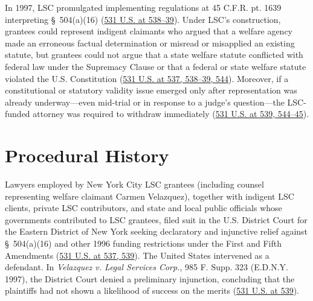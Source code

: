 \documentclass[12pt]{article}
\begin{document}
In 1997, LSC promulgated implementing regulations at 45 C.F.R. pt. 1639 interpreting \S~504(a)(16) (\href{https://supreme.justia.com/cases/federal/us/531/533/}{531 U.S. at 538--39}). Under LSC's construction, grantees could represent indigent claimants who argued that a welfare agency made an erroneous factual determination or misread or misapplied an existing statute, but grantees could not argue that a state welfare statute conflicted with federal law under the Supremacy Clause or that a federal or state welfare statute violated the U.S. Constitution (\href{https://supreme.justia.com/cases/federal/us/531/533/}{531 U.S. at 537, 538--39, 544}). Moreover, if a constitutional or statutory validity issue emerged only after representation was already underway---even mid-trial or in response to a judge's question---the LSC-funded attorney was required to withdraw immediately (\href{https://supreme.justia.com/cases/federal/us/531/533/}{531 U.S. at 539, 544--45}).

\section{Procedural History}
Lawyers employed by New York City LSC grantees (including counsel representing welfare claimant Carmen Velazquez), together with indigent LSC clients, private LSC contributors, and state and local public officials whose governments contributed to LSC grantees, filed suit in the U.S. District Court for the Eastern District of New York seeking declaratory and injunctive relief against \S~504(a)(16) and other 1996 funding restrictions under the First and Fifth Amendments (\href{https://supreme.justia.com/cases/federal/us/531/533/}{531 U.S. at 537, 539}). The United States intervened as a defendant. In \textit{Velazquez v. Legal Services Corp.}, 985 F. Supp. 323 (E.D.N.Y. 1997), the District Court denied a preliminary injunction, concluding that the plaintiffs had not shown a likelihood of success on the merits (\href{https://supreme.justia.com/cases/federal/us/531/533/}{531 U.S. at 539}).
\end{document}
